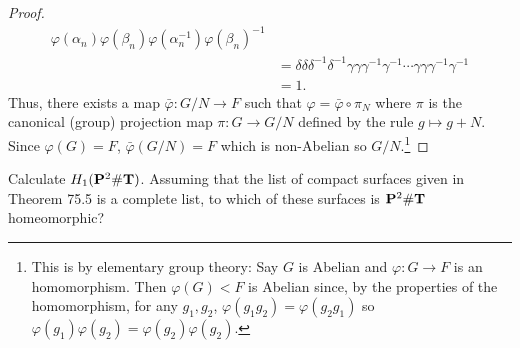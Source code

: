 \begin{proof}
\begin{align*}
\varphi(\alpha_n)\varphi(\beta_n)\varphi(\alpha_n^{-1})\varphi(\beta_n)^{-1}\\
&=\delta\delta\delta^{-1}\delta^{-1}\gamma\gamma\gamma^{-1}\gamma^{-1}
\cdots\gamma\gamma\gamma^{-1}\gamma^{-1}\\
&=1.
\end{align*}
Thus, there exists a map $\bar\varphi\colon G/N\to F$ such that
$\varphi=\bar\varphi\circ\pi_N$ where $\pi$ is the canonical (group)
projection map $\pi\colon G\to G/N$ defined by the rule $g\mapsto
g+N$. Since $\varphi(G)=F$, $\bar\varphi(G/N)=F$ which is non-Abelian so
$G/N$.\footnote{This is by elementary group theory: Say $G$ is Abelian and
  $\varphi\colon G\to F$ is an homomorphism. Then $\varphi(G)<F$ is Abelian
  since, by the properties of the homomorphism, for any $g_1,g_2$,
  $\varphi(g_1g_2)=\varphi(g_2g_1)$ so
  $\varphi(g_1)\varphi(g_2)=\varphi(g_2)\varphi(g_2)$.}
\end{proof}
\newpage
\begin{problem}[Munkres \S75, Ex.\,1]
Calculate $H_1(\mathbf{P}^2\#\mathbf{T})$. Assuming that the list of compact surfaces given
in Theorem 75.5 is a complete list, to which of these surfaces is $\mathbf{P}^2\#\mathbf{T}$
homeomorphic?
\end{problem}
